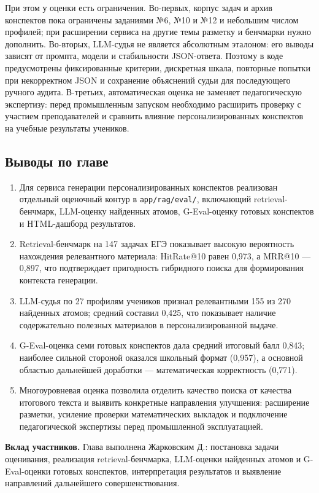 \documentclass[a4paper,12pt]{extarticle}
\newcommand{\code}[1]{\texttt{\seqsplit{#1}}}
\begin{document}
При этом у оценки есть ограничения. Во-первых, корпус задач и архив конспектов
пока ограничены заданиями №6, №10 и №12 и небольшим числом профилей; при
расширении сервиса на другие темы разметку и бенчмарки нужно дополнить.
Во-вторых, LLM-судья не является абсолютным эталоном: его выводы зависят от
промпта, модели и стабильности JSON-ответа. Поэтому в коде предусмотрены
фиксированные критерии, дискретная шкала, повторные попытки при некорректном
JSON и сохранение объяснений судьи для последующего ручного аудита. В-третьих,
автоматическая оценка не заменяет педагогическую экспертизу: перед промышленным
запуском необходимо расширить проверку с участием преподавателей и сравнить
влияние персонализированных конспектов на учебные результаты учеников.

\subsection{Выводы по главе}

\begin{enumerate}
    \item Для сервиса генерации персонализированных конспектов реализован
        отдельный оценочный контур в \texttt{app/rag/eval/}, включающий
        retrieval-бенчмарк, LLM-оценку найденных атомов, G-Eval-оценку готовых
        конспектов и HTML-дашборд результатов.
    \item Retrieval-бенчмарк на 147 задачах ЕГЭ показывает высокую вероятность
        нахождения релевантного материала: HitRate@10 равен 0,973, а MRR@10 ---
        0,897, что подтверждает пригодность гибридного поиска для формирования
        контекста генерации.
    \item LLM-судья по 27 профилям учеников признал релевантными 155 из 270
        найденных атомов; средний \code{judge\_score} составил 0,425, что
        показывает наличие содержательно полезных материалов в персонализированной
        выдаче.
    \item G-Eval-оценка семи готовых конспектов дала средний итоговый балл
        0,843; наиболее сильной стороной оказался школьный формат (0,957), а
        основной областью дальнейшей доработки --- математическая корректность
        (0,771).
    \item Многоуровневая оценка позволила отделить качество поиска от качества
        итогового текста и выявить конкретные направления улучшения: расширение
        разметки, усиление проверки математических выкладок и подключение
        педагогической экспертизы перед промышленной эксплуатацией.
\end{enumerate}
\textbf{Вклад участников.}
Глава выполнена Жарковским Д.: постановка задачи оценивания,
реализация retrieval-бенчмарка, LLM-оценки найденных атомов и G-Eval-оценки готовых
конспектов, интерпретация результатов и выявление направлений дальнейшего
совершенствования.
\pagebreak
\end{document}
